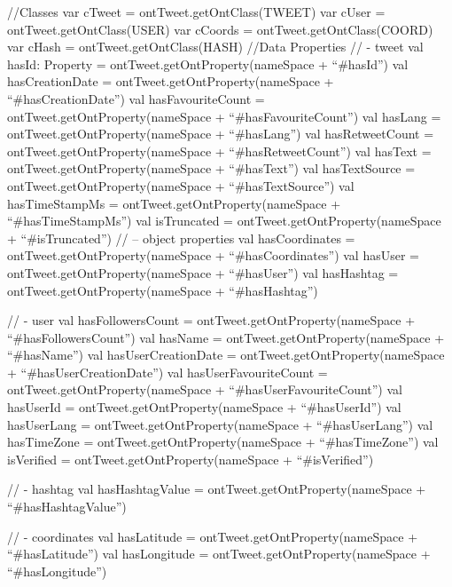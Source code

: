 \begin{listing}[
  language = scala,
  numbers=left,
  numberstyle=\tiny,
  stepnumber=5,
  numbersep=5pt,
  frame=single,
  caption  = {ms.semtweet: transformación a triplas},
  label    = code:ms.semtweet]
{{    //Classes
    var cTweet = ontTweet.getOntClass(TWEET)
    var cUser = ontTweet.getOntClass(USER)
    var cCoords = ontTweet.getOntClass(COORD)
    var cHash = ontTweet.getOntClass(HASH)
    //Data Properties
    // - tweet
    val hasId: Property = ontTweet.getOntProperty(nameSpace + ``#hasId'')
    val hasCreationDate = ontTweet.getOntProperty(nameSpace + ``#hasCreationDate'')
    val hasFavouriteCount = ontTweet.getOntProperty(nameSpace + ``#hasFavouriteCount'')
    val hasLang = ontTweet.getOntProperty(nameSpace + ``#hasLang'')
    val hasRetweetCount = ontTweet.getOntProperty(nameSpace + ``#hasRetweetCount'')
    val hasText = ontTweet.getOntProperty(nameSpace + ``#hasText'')
    val hasTextSource = ontTweet.getOntProperty(nameSpace + ``#hasTextSource'')
    val hasTimeStampMs = ontTweet.getOntProperty(nameSpace + ``#hasTimeStampMs'')
    val isTruncated = ontTweet.getOntProperty(nameSpace + ``#isTruncated'')
    // -- object properties
    val hasCoordinates = ontTweet.getOntProperty(nameSpace + ``#hasCoordinates'')
    val hasUser = ontTweet.getOntProperty(nameSpace + ``#hasUser'')
    val hasHashtag = ontTweet.getOntProperty(nameSpace + ``#hasHashtag'')

    // - user
    val hasFollowersCount = ontTweet.getOntProperty(nameSpace + ``#hasFollowersCount'')
    val hasName = ontTweet.getOntProperty(nameSpace + ``#hasName'')
    val hasUserCreationDate = ontTweet.getOntProperty(nameSpace + ``#hasUserCreationDate'')
    val hasUserFavouriteCount = ontTweet.getOntProperty(nameSpace + ``#hasUserFavouriteCount'')
    val hasUserId = ontTweet.getOntProperty(nameSpace + ``#hasUserId'')
    val hasUserLang = ontTweet.getOntProperty(nameSpace + ``#hasUserLang'')
    val hasTimeZone = ontTweet.getOntProperty(nameSpace + ``#hasTimeZone'')
    val isVerified = ontTweet.getOntProperty(nameSpace + ``#isVerified'')

    // - hashtag
    val hasHashtagValue = ontTweet.getOntProperty(nameSpace + ``#hasHashtagValue'')

    // - coordinates
    val hasLatitude = ontTweet.getOntProperty(nameSpace + ``#hasLatitude'')
    val hasLongitude = ontTweet.getOntProperty(nameSpace + ``#hasLongitude'')

}}
\end{listing}
